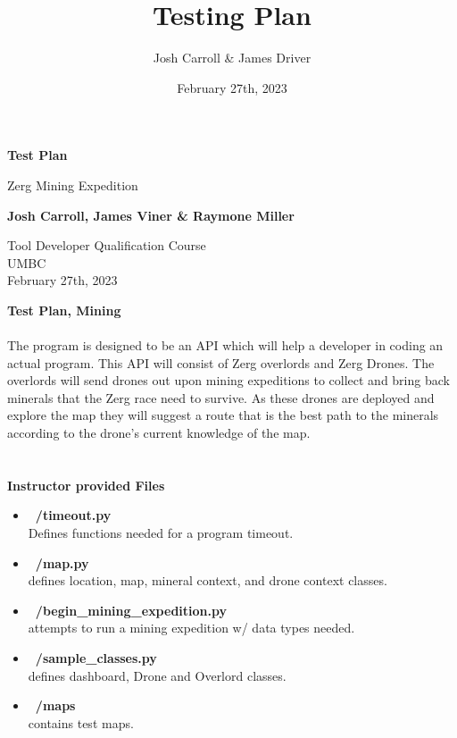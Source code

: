 \documentclass{article}
\title{Testing Plan}
\author{Josh Carroll & James Driver}
\date{February 27th, 2023}
\begin{document}
\begin{titlepage}
   \begin{center}
       \vspace*{1cm}

       \textbf{Test Plan}

       \vspace{0.5cm}
        Zerg Mining Expedition
            
       \vspace{1.5cm}

       \textbf{Josh Carroll, James Viner \& Raymone Miller}

       \vfill
            
       \vspace{0.8cm}
            
       Tool Developer Qualification Course\\
       UMBC\\
       February 27th, 2023
            
   \end{center}
\end{titlepage}
\noindent\Huge\textbf{Test Plan, Mining}\\
\\
\Large{The program is designed to be an API which will help a developer in coding
an actual program. This API will consist of Zerg overlords and Zerg Drones.
The overlords will send drones out upon mining expeditions to collect and
bring back minerals that the Zerg race need to survive. As these drones are
deployed and explore the map they will suggest a route that is the best path
to the minerals according to the drone’s current knowledge of the map.}\\
\\

\\
\noindent\Large\textbf{Instructor provided Files}
\begin{itemize}
  \item \textbf{~/timeout.py}\\
  {Defines functions needed for a program timeout.}
   \item \textbf{~/map.py}\\
  {defines location, map, mineral context, and drone context classes.}
   \item \textbf{~/begin\_mining\_expedition.py}\\
  {attempts to run a mining expedition w/ data types needed.}
   \item \textbf{~/sample\_classes.py}\\
  {defines dashboard, Drone and Overlord classes.}
     \item \textbf{~/maps}\\
  {contains test maps.}
\end{itemize}
\end{document}
